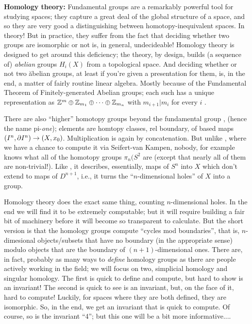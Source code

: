 {\bf Homology theory:} Fundamental groups are a remarkably powerful
tool for studying spaces; they capture a great deal of the global
structure of a space, and so they are very good a distinguishing
between homotopy-inequivalent spaces. In theory! But in practice,
they suffer from the fact that deciding whether two groups are 
isomorphic or not is, in general, undecideable! Homology theory
is designed to get around this deficiency; the theory, by design,
builds (a sequence of) {\it abelian} groups $H_i(X)$ from a topological
space. And deciding whether or not two \u{abelian} groups, at least
if you're given a presentation for them, is, in the end, a matter of
fairly routine linear algebra. Mostly because of the Fundamental Theorem
of Finitely-generated Abelian groups; each such has a unique representation
as ${\Bbb Z}^m\oplus{\Bbb Z}_{m_1}\oplus\cdots\oplus{\Bbb Z}_{m_n}$
with $m_{i+1}|m_i$ for every $i$ .

\msk

There are also ``higher'' homotopy groups beyond the fundamental group \mpu ,
(hence the name pi-{\it one}); elements are homtopy classes, rel boundary, 
of based maps $(I^n,\partial I^n)\rightarrow(X,x_0)$. Multiplication is again by
concatenation. But unlike \mpu , where we have a chance to compute it
via Seifert-van Kampen, nobody, for example knows what all of the 
homotopy groups $\pi_n(S^2$ are (except that nearly all of them are
non-trivial!). Like \mpu, it describes, essentially, maps of $S^n$ into
$X$ which don't extend to maps of $D^{n+1}$, i.e., it turns the ``$n$-dimensional
holes'' of $X$ into a group.

\msk

Homology theory does the exact same thing, counting $n$-dimensional holes.
In the end we will find it to be extremely computable; but it will require
building a fair bit of machinery before it will become so transparent to
calculate. But the short version is that the homology groups compute
``cycles mod boundaries'', that is, $n$-dimesional objects/subsets that
have no boundary (in the appropriate sense) modulo objects that are the
boundary of $(n+1)$-dimensional ones. There are, in fact, probably as many
ways to {\it define} homology groups as there are people actively working
in the field; we will focus on two, simplicial homology and singular homology.
The first is quick to define and compute, but hard to show is an invariant!
The second is quick to see is an invariant, but, on the face of it, hard
to compute! Luckily, for spaces where they are both defined, they are
isomorphic. So, in the end, we get an invariant that is quick to compute.
Of course, so is the invariant ``4''; but this one will be a bit more
informative....

